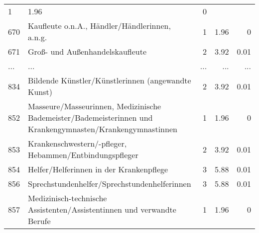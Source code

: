 \begin{longtable}{lXrrr}
          \num{1} &
          \num[round-mode=places,round-precision=2]{1.96} &
          \num[round-mode=places,round-precision=2]{0} \\
        670 & \multicolumn{1}{X}{Kaufleute o.n.A., Händler/Händlerinnen, a.n.g.} & %
          \num{1} &
          \num[round-mode=places,round-precision=2]{1.96} &
          \num[round-mode=places,round-precision=2]{0} \\
        671 & \multicolumn{1}{X}{Groß- und Außenhandelskaufleute} & %
          \num{2} &
          \num[round-mode=places,round-precision=2]{3.92} &
          \num[round-mode=places,round-precision=2]{0.01} \\
       ... & ... & ... & ... & ... \\
        834 & \multicolumn{1}{X}{Bildende Künstler/Künstlerinnen (angewandte Kunst)} & %
          \num{2} &
          \num[round-mode=places,round-precision=2]{3.92} &
          \num[round-mode=places,round-precision=2]{0.01} \\

        852 & \multicolumn{1}{X}{Masseure/Masseurinnen, Medizinische Bademeister/Bademeisterinnen und Krankengymnasten/Krankengymnastinnen} & %
          \num{1} &
          \num[round-mode=places,round-precision=2]{1.96} &
          \num[round-mode=places,round-precision=2]{0} \\

        853 & \multicolumn{1}{X}{Krankenschwestern/-pfleger, Hebammen/Entbindungspfleger} & %
          \num{2} &
          \num[round-mode=places,round-precision=2]{3.92} &
          \num[round-mode=places,round-precision=2]{0.01} \\

        854 & \multicolumn{1}{X}{Helfer/Helferinnen in der Krankenpflege} & %
          \num{3} &
          \num[round-mode=places,round-precision=2]{5.88} &
          \num[round-mode=places,round-precision=2]{0.01} \\

        856 & \multicolumn{1}{X}{Sprechstundenhelfer/Sprechstundenhelferinnen} & %
          \num{3} &
          \num[round-mode=places,round-precision=2]{5.88} &
          \num[round-mode=places,round-precision=2]{0.01} \\

        857 & \multicolumn{1}{X}{Medizinisch-technische Assistenten/Assistentinnen und verwandte Berufe} & %
          \num{1} &
          \num[round-mode=places,round-precision=2]{1.96} &
          \num[round-mode=places,round-precision=2]{0} \\


\end{longtable}
